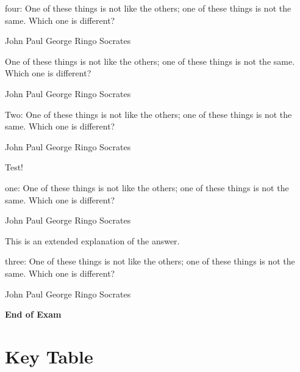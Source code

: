 \documentclass[]{exam}
\newcommand{\sol}[1]{{\ifprintanswers \color{red} #1 \fi}}
\begin{document}
\begin{questions}




\question
four: One of these things is not like the others; one of these
things is not the same. Which one is different?

\begin{randomizechoices}
\choice John
\choice Paul
\choice George
\choice Ringo
\CorrectChoice Socrates
\end{randomizechoices}

\question
One of these things is not like the others; one of these
things is not the same. Which one is different?

\begin{randomizechoices}
\choice John
\choice Paul
\choice George
\choice Ringo
\CorrectChoice Socrates
\end{randomizechoices}

\question
Two: One of these things is not like the others; one of these
things is not the same. Which one is different?

\begin{randomizechoices}
\choice John
\choice Paul
\choice George
\choice Ringo
\CorrectChoice Socrates
\end{randomizechoices}

\sol{Test!}

\question
one: One of these things is not like the others; one of these
things is not the same. Which one is different?

\begin{randomizechoices}
\choice John
\choice Paul
\choice George
\choice Ringo
\CorrectChoice Socrates
\end{randomizechoices}
\sol{This is an extended explanation of the answer.}

\question
three: One of these things is not like the others; one of these
things is not the same. Which one is different?

\begin{randomizechoices}
\choice John
\choice Paul
\choice George
\choice Ringo
\CorrectChoice Socrates
\end{randomizechoices}

\clearpage



\end{questions}


\vspace{5cm}
\Huge \begin{center} \textbf{End of Exam} \end{center}

\clearpage

\section*{Key Table}
\normalsize

\printkeytable[1-30]%

\writekeylist{\mykeylist}

\savekeylist[\yesthekeylist]

\end{document}
